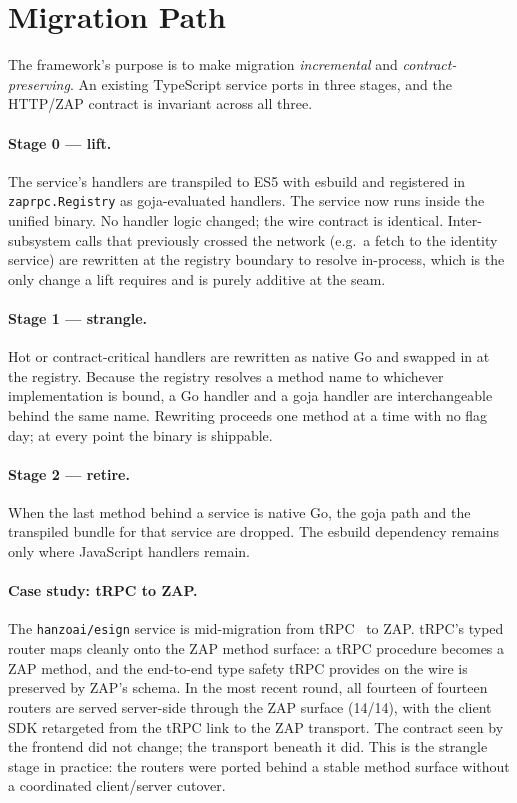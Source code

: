 \documentclass[11pt]{article}
\begin{document}
\section{Migration Path}
\label{sec:migration}

The framework's purpose is to make migration \emph{incremental} and
\emph{contract-preserving}. An existing TypeScript service ports in three
stages, and the HTTP/ZAP contract is invariant across all three.

\paragraph{Stage 0 --- lift.}
The service's handlers are transpiled to ES5 with esbuild and registered in
\texttt{zaprpc.Registry} as goja-evaluated handlers. The service now runs
inside the unified binary. No handler logic changed; the wire contract is
identical. Inter-subsystem calls that previously crossed the network (e.g.\
a fetch to the identity service) are rewritten at the registry boundary to
resolve in-process, which is the only change a lift requires and is purely
additive at the seam.

\paragraph{Stage 1 --- strangle.}
Hot or contract-critical handlers are rewritten as native Go and swapped in
at the registry. Because the registry resolves a method name to whichever
implementation is bound, a Go handler and a goja handler are
interchangeable behind the same name. Rewriting proceeds one method at a
time with no flag day; at every point the binary is shippable.

\paragraph{Stage 2 --- retire.}
When the last method behind a service is native Go, the goja path and the
transpiled bundle for that service are dropped. The esbuild dependency
remains only where JavaScript handlers remain.

\paragraph{Case study: tRPC to ZAP.}
The \texttt{hanzoai/esign} service is mid-migration from
tRPC~\cite{trpc} to ZAP. tRPC's typed router maps cleanly onto the ZAP
method surface: a tRPC procedure becomes a ZAP method, and the
end-to-end type safety tRPC provides on the wire is preserved by ZAP's
schema. In the most recent round, all fourteen of fourteen routers are
served server-side through the ZAP surface (14/14), with the client
SDK retargeted from the tRPC link to the ZAP transport. The contract seen
by the frontend did not change; the transport beneath it did. This is the
strangle stage in practice: the routers were ported behind a stable
method surface without a coordinated client/server cutover.
\end{document}
